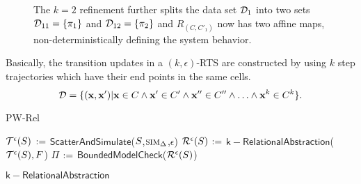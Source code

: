 \begin{figure}[!htbp]
\begin{center}
\begin{tikzpicture}
\end{tikzpicture}
\end{center}
\vspace*{-.3cm}
\caption{The $k=2$ refinement further splits the data set $\ds_1$
    into two sets $\ds_{11} = \setof{\pi_1}$ and $\ds_{12} =
    \setof{\pi_2}$ and $R_{(C,C'_1)}$ now has two affine maps,
    non-deterministically defining the system behavior.}
\label{fig:k2}
\vspace*{-.3cm}
\end{figure}


Basically, the transition updates in a $(k,\epsilon)$-RTS are
constructed by using $k$ step trajectories which have their end points
in the same cells.
\[
    \ds = \setof{(\vx,\vx') | \vx \in C \land \vx' \in C' \land \vx''
    \in C'' \land \ldots \land \vx^k \in C^k }.
\]


\begin{algorithm}[t]
\DontPrintSemicolon
\caption{PW-Rel\label{algo:pwa-rel}}
    $\TSAbstraction{\epsilon}{\System}$ $\assign$ $\mathsf{ScatterAndSimulate}$($\System$,$\simmap_\Delta$,$\epsilon$)  \;
    $\RTSAbstraction{\epsilon}{\System}$ $\assign$
    $\mathsf{k-RelationalAbstraction}$($\TSAbstraction{\epsilon}{\System},
    F$)  \;
    $\Pi$ $\assign$ $\mathsf{BoundedModelCheck}$($\RTSAbstraction{\epsilon}{\System}$)  \;
\end{algorithm}

\begin{algorithm}[t]
\DontPrintSemicolon
    \caption{$\mathsf{k-RelationalAbstraction}$\label{algo:krelabs}}
\end{algorithm}
